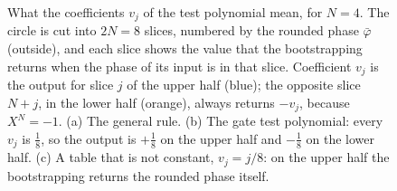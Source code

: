 \begin{figure}[!htb]
\centering

\caption{What the coefficients $v_j$ of the test polynomial mean, for $N=4$.
The circle is cut into $2N=8$ slices, numbered by the rounded phase
$\bar\varphi$ (outside), and each slice shows the value that the bootstrapping
returns when the phase of its input is in that slice. Coefficient $v_j$ is the
output for slice $j$ of the upper half (blue); the opposite slice $N+j$, in the
lower half (orange), always returns $-v_j$, because $X^N=-1$. (a) The general
rule. (b) The gate test polynomial: every $v_j$ is $\frac18$, so the output is
$+\frac18$ on the upper half and $-\frac18$ on the lower half. (c) A table that
is not constant, $v_j=j/8$: on the upper half the bootstrapping returns the
rounded phase itself.}
\label{fig:testwheel}
\end{figure}
